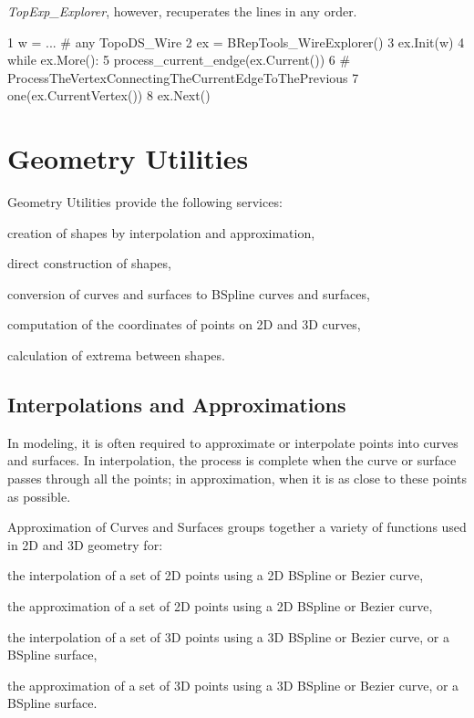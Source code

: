 {\itshape Top\+Exp\+\_\+\+Explorer}, however, recuperates the lines in any order.


\begin{DoxyCode}
1 w = ... \textcolor{comment}{# any TopoDS\_Wire}
2 ex = BRepTools\_WireExplorer()
3 ex.Init(w)
4 \textcolor{keywordflow}{while} ex.More():
5  process\_current\_endge(ex.Current())
6  \textcolor{comment}{# ProcessTheVertexConnectingTheCurrentEdgeToThePrevious }
7  one(ex.CurrentVertex())
8  ex.Next() 
\end{DoxyCode}
\hypertarget{occt_user_guides__modeling_data_occt_modat_1}{}\section{Geometry Utilities}\label{occt_user_guides__modeling_data_occt_modat_1}
Geometry Utilities provide the following services\+:
\begin{DoxyItemize}
\item creation of shapes by interpolation and approximation,
\item direct construction of shapes,
\item conversion of curves and surfaces to B\+Spline curves and surfaces,
\item computation of the coordinates of points on 2D and 3D curves,
\item calculation of extrema between shapes.
\end{DoxyItemize}\hypertarget{occt_user_guides__modeling_data_occt_modat_1_1}{}\subsection{Interpolations and Approximations}\label{occt_user_guides__modeling_data_occt_modat_1_1}
In modeling, it is often required to approximate or interpolate points into curves and surfaces. In interpolation, the process is complete when the curve or surface passes through all the points; in approximation, when it is as close to these points as possible.

Approximation of Curves and Surfaces groups together a variety of functions used in 2D and 3D geometry for\+:
\begin{DoxyItemize}
\item the interpolation of a set of 2D points using a 2D B\+Spline or Bezier curve,
\item the approximation of a set of 2D points using a 2D B\+Spline or Bezier curve,
\item the interpolation of a set of 3D points using a 3D B\+Spline or Bezier curve, or a B\+Spline surface,
\item the approximation of a set of 3D points using a 3D B\+Spline or Bezier curve, or a B\+Spline surface.
\end{DoxyItemize}

